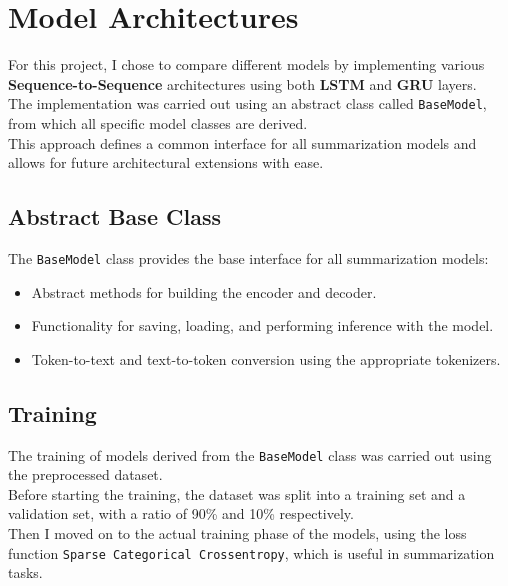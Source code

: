 

\section{Model Architectures}
For this project, I chose to compare different models by implementing various \textbf{Sequence-to-Sequence} architectures using both \textbf{LSTM} and \textbf{GRU} layers.\\
The implementation was carried out using an abstract class called \texttt{BaseModel}, from which all specific model classes are derived.\\
This approach defines a common interface for all summarization models and allows for future architectural extensions with ease.\\

\subsection{Abstract Base Class}
The \texttt{BaseModel} class provides the base interface for all summarization models:
\begin{itemize}
    \item Abstract methods for building the encoder and decoder.
    \item Functionality for saving, loading, and performing inference with the model.
    \item Token-to-text and text-to-token conversion using the appropriate tokenizers.
\end{itemize}

\subsection{Training}
The training of models derived from the \texttt{BaseModel} class was carried out using the preprocessed dataset.\\
Before starting the training, the dataset was split into a training set and a validation set, with a ratio of 90\% and 10\% respectively.\\
Then I moved on to the actual training phase of the models, using the loss function \texttt{Sparse Categorical Crossentropy}, which is useful in summarization tasks.\\

